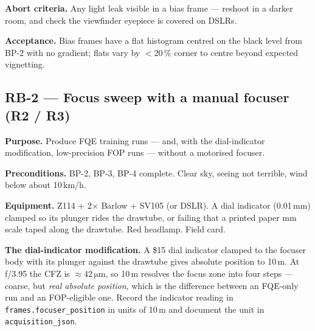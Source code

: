 \documentclass[11pt]{article}
\newcommand{\co}[1]{\texttt{\small #1}}
\begin{document}
\textbf{Abort criteria.} Any light leak visible in a bias frame --- reshoot in a
darker room, and check the viewfinder eyepiece is covered on DSLRs.

\textbf{Acceptance.} Bias frames have a flat histogram centred on the black
level from BP-2 with no gradient; flats vary by $<20\,\%$ corner to centre
beyond expected vignetting.

\subsection*{RB-2 --- Focus sweep with a manual focuser (R2 / R3)}

\textbf{Purpose.} Produce FQE training runs --- and, with the dial-indicator
modification, low-precision FOP runs --- without a motorised focuser.

\textbf{Preconditions.} BP-2, BP-3, BP-4 complete. Clear sky, seeing not
terrible, wind below about 10\,km/h.

\textbf{Equipment.} Z114 + 2$\times$ Barlow + SV105 (or DSLR). A dial indicator
(0.01\,mm) clamped so its plunger rides the drawtube, or failing that a printed
paper mm scale taped along the drawtube. Red headlamp. Field card.

\begin{keybox}
\textbf{The dial-indicator modification.} A \$15 dial indicator clamped to the
focuser body with its plunger against the drawtube gives absolute position to
10\,\textmu m. At f/3.95 the CFZ is $\approx 42\,\mathrm{\mu m}$, so 10\,\textmu m
resolves the focus zone into four steps --- coarse, but \emph{real absolute
position}, which is the difference between an FQE-only run and an FOP-eligible
one. Record the indicator reading in \co{frames.focuser\_position} in units of
10\,\textmu m and document the unit in \co{acquisition\_json}.
\end{keybox}
\end{document}
